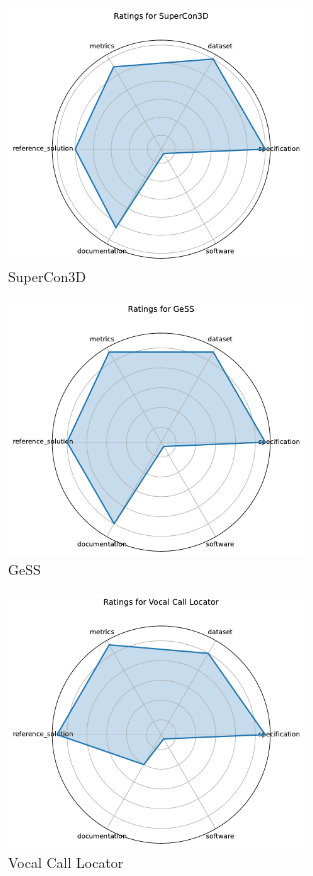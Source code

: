 \documentclass{article}
\begin{document}
\begin{figure}[h!]
  \centering
  \includegraphics[width=0.7\textwidth]{SuperCon3D_radar.pdf}
  \caption{SuperCon3D}
\end{figure}

\begin{figure}[h!]
  \centering
  \includegraphics[width=0.7\textwidth]{GeSS_radar.pdf}
  \caption{GeSS}
\end{figure}

\begin{figure}[h!]
  \centering
  \includegraphics[width=0.7\textwidth]{Vocal Call Locator_radar.pdf}
  \caption{Vocal Call Locator}
\end{figure}
\end{document}
